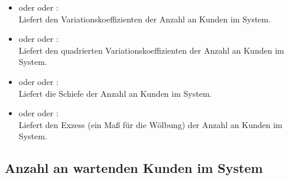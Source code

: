 \begin{itemize}
\item
{} oder  oder :\\
Liefert den Variationskoeffizienten der Anzahl an Kunden im System.

\item
{} oder  oder :\\
Liefert den quadrierten Variationskoeffizienten der Anzahl an Kunden im System.

\item
{} oder  oder :\\
Liefert die Schiefe der Anzahl an Kunden im System.

\item
{} oder  oder :\\
Liefert den Exzess (ein Maß für die Wölbung) der Anzahl an Kunden im System.

\end{itemize}



\subsection{Anzahl an wartenden Kunden im System}

